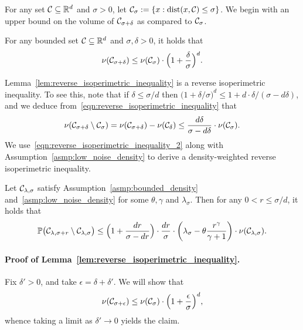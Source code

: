 For any set $\mathcal{C} \subseteq \mathbb{R}^d$ and $\sigma > 0$, let $\mathcal{C}_{\sigma} := \{x: \mathrm{dist}(x,\mathcal{C}) \leq \sigma\}$. We begin with an upper bound on the volume of $\mathcal{C}_{\sigma + \delta}$ as compared to $\mathcal{C}_{\sigma}$. 
\begin{lemma}
	\label{lem:reverse_isoperimetric_inequality}
	For any bounded set $\mathcal{C} \subseteq \mathbb{R}^d$ and  $\sigma, \delta > 0$, it holds that
	\begin{equation}
	\label{eqn:reverse_isoperimetric_inequality}
	\nu(\mathcal{C}_{\sigma + \delta}) \leq \nu(\mathcal{C}_{\sigma}) \cdot \Bigl(1 + \frac{\delta}{\sigma}\Bigr)^d.
	\end{equation}
\end{lemma}
Lemma~\ref{lem:reverse_isoperimetric_inequality} is a reverse isoperimetric inequality. To see this, note that if $\delta \leq \sigma/d$ then $\bigl(1 + \delta/\sigma\bigr)^d \leq 1 + d \cdot \delta/(\sigma - d\delta)$, and we deduce from~\eqref{eqn:reverse_isoperimetric_inequality} that
\begin{equation}
\label{eqn:reverse_isoperimetric_inequality_2}
\nu(\mathcal{C}_{\sigma + \delta} \setminus \mathcal{C}_{\sigma}) = \nu(\mathcal{C}_{\sigma + \delta}) - \nu(\mathcal{C}_{\delta}) \leq \frac{d\delta}{\sigma - d\delta} \cdot \nu(\mathcal{C}_{\sigma}).
\end{equation}
We use~\eqref{eqn:reverse_isoperimetric_inequality_2} along with Assumption~\ref{asmp:low_noise_density} to derive a density-weighted reverse isoperimetric inequality. 
\begin{lemma}
	\label{lem:reverse_isoperimetric_inequality_density_weighted}
	Let $\mathcal{C}_{\lambda,\sigma}$ satisfy Assumption~\ref{asmp:bounded_density} and~\ref{asmp:low_noise_density} for some $\theta, \gamma$ and $\lambda_{\sigma}$. Then for any $0 < r \leq \sigma/d$, it holds that
	\begin{equation}
	\label{eqn:reverse_isoperimetric_inequality_density_weighted}
	\mathbb{P}\bigl(\mathcal{C}_{\lambda,\sigma + r} \setminus \mathcal{C}_{\lambda,\sigma}\bigr) \leq \Bigl(1 + \frac{dr}{\sigma - dr}\Bigr) \cdot \frac{dr}{\sigma} \cdot \left(\lambda_{\sigma} - \theta\frac{r^{\gamma}}{\gamma + 1}\right) \cdot \nu(\mathcal{C}_{\lambda,\sigma}).
	\end{equation}
\end{lemma}
\paragraph{Proof of Lemma~\ref{lem:reverse_isoperimetric_inequality}.}
	Fix $\delta' > 0$, and take $\epsilon = \delta + \delta'$. We will show that
	\begin{equation}
	\label{pf:reverse_isoperimetric_inequality}
	\nu(\mathcal{C}_{\sigma + \epsilon}) \leq \nu(\mathcal{C}_{\sigma}) \cdot \Bigl(1 + \frac{\epsilon}{\sigma}\Bigr)^d,
	\end{equation}
	whence taking a limit as $\delta' \to 0$ yields the claim.
	
